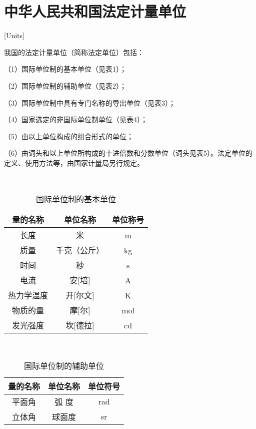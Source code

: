 \chapter{中华人民共和国法定计量单位}[Units]

我国的法定计量单位（简称法定单位）包括：

（1）国际单位制的基本单位（见表1）；

（2）国际单位制的辅助单位（见表2）；

（3）国际单位制中具有专门名称的导出单位（见表3）；

（4）国家选定的非国际单位制单位（见表4）；

（5）由以上单位构成的组合形式的单位；

（6）由词头和以上单位所构成的十进倍数和分数单位（词头见表5）。法定单位的定义、使用方法等，由国家计量局另行规定。 

\hspace*{\fill} \\


\begin{table}[htbp]
  \centering
  \caption{国际单位制的基本单位}
  \begin{tabular}{ccc}
    \toprule
    量的名称  & 单位名称   & 单位称号 \\
    \midrule
    长度    & 米      & m    \\
    质量    & 千克（公斤） & kg   \\
    时间    & 秒      & s    \\
    电流    & 安[培]   & A    \\
    热力学温度 & 开[尔文]  & K    \\
    物质的量  & 摩[尔]   & mol  \\
    发光强度  & 坎[德拉]  & cd   \\
    \bottomrule
  \end{tabular}%
  \label{tab:tbl-b1}%
\end{table}%

\hspace*{\fill} \\


\begin{table}[htbp]
  \centering
  \caption{国际单位制的辅助单位}
  \begin{tabular}{ccc}
    \toprule
    量的名称 & 单位名称 & 单位符号 \\
    \midrule
    平面角  & 弧 度  & rad  \\
    立体角  & 球面度  & sr   \\
    \bottomrule
  \end{tabular}%
  \label{tab:tbl-b2}%
\end{table}%

